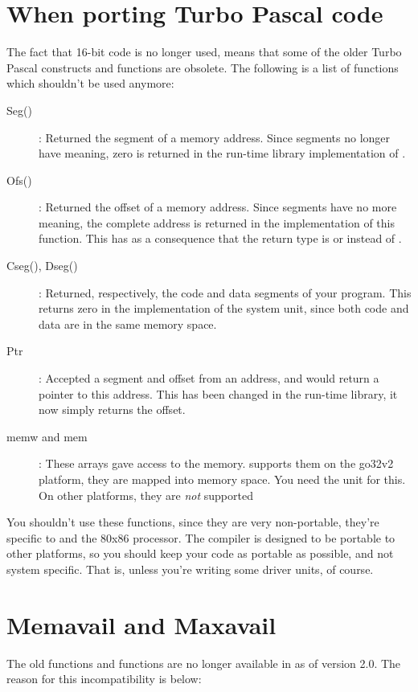 \section{When porting Turbo Pascal code}
The fact that 16-bit code is no longer used, means that some of the older
Turbo Pascal constructs and functions are obsolete. The following is a
list of functions which shouldn't be used anymore:
\begin{description}
\item [Seg()]: Returned the segment of a memory address. Since segments no
longer have meaning, zero is returned in the \fpc run-time library implementation of
.
\item [Ofs()]: Returned the offset of a memory address. Since segments have
no more meaning, the complete address is returned in the \fpc implementation
of this function. This has as a consequence that the return type is
 or  instead of .
\item [Cseg(), Dseg()]: Returned, respectively, the code and data segments
of your program.  This returns zero in the \fpc implementation of the
system unit, since both code and data are in the same memory space.
\item [Ptr]: Accepted a segment and offset from an address, and would return
a pointer to this address. This has been changed in the run-time library, it
now simply returns the offset.
\item [memw and mem]: These arrays gave access to the \dos memory. \fpc
supports them on the go32v2 platform, they are mapped into \dos memory
space. You need the  unit for this. On other platforms, they are
{\em not} supported
\end{description}

You shouldn't use these functions, since they are very non-portable, they're
specific to \dos and the 80x86 processor. The \fpc compiler is designed to be
portable to other platforms, so you should keep your code as portable as
possible, and not system specific. That is, unless you're writing some driver
units, of course.

\section{Memavail and Maxavail}

The old \tp functions  and  functions are 
no longer available in \fpc as of version 2.0. The reason for this 
incompatibility is below:

